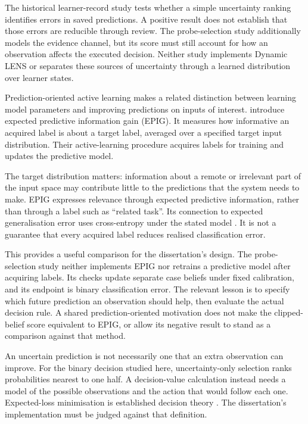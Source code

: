 The historical learner-record study tests whether a simple uncertainty ranking identifies errors in saved predictions. A positive result does not establish
that those errors are reducible through review. The probe-selection study additionally models the evidence channel, but its score must still account
for how an observation affects the executed decision. Neither study implements Dynamic LENS or separates these sources of
uncertainty through a learned distribution over learner states.

Prediction-oriented active learning makes a related distinction between learning model parameters and improving predictions
on inputs of interest. \textcite[Sections 2.1 and 4]{bickfordsmith2023prediction} introduce expected predictive information gain
(EPIG). It measures how informative an acquired label is about a target label, averaged over a specified target input
distribution. Their active-learning procedure acquires labels for training and updates the predictive model.

The target distribution matters: information about a remote or irrelevant part of the input space may contribute little to
the predictions that the system needs to make. EPIG expresses relevance through expected predictive information, rather than
through a label such as ``related task''. Its connection to expected generalisation error uses cross-entropy under the stated
model \parencite[Section 4, equation 5]{bickfordsmith2023prediction}. It is not a guarantee that every acquired label reduces
realised classification error.

This provides a useful comparison for the dissertation's design. The probe-selection study neither implements EPIG nor retrains a predictive model
after acquiring labels. Its checks update separate case beliefs under fixed calibration, and its endpoint is binary
classification error. The relevant lesson is to specify which future prediction an observation should help, then evaluate
the actual decision rule. A shared prediction-oriented motivation does not make the clipped-belief score equivalent to EPIG,
or allow its negative result to stand as a comparison against that method.

An uncertain prediction is not necessarily one that an extra observation can improve. For the binary decision studied here,
uncertainty-only selection ranks probabilities nearest to one half. A decision-value calculation instead needs a model of the
possible observations and the action that would follow each one. Expected-loss minimisation is established decision theory
\parencite[Section 5.7]{murphy2012machine}. The dissertation's implementation must be judged against that definition.

